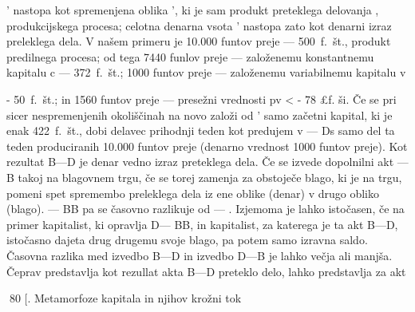 \documentclass[kapital_02.tex]{subfiles}
\begin{document}
\KPED' nastopa kot spremenjena oblika \KPEB', ki je sam produkt preteklega delovanja \KPEP, produkcijskega procesa; celotna denarna vsota \KPED' nastopa zato kot denarni izraz preleklega dela. V našem primeru je 10.000 funtov preje — 500~f.~št., produkt predilnega procesa; od tega 7440 funlov preje — založenemu konstantnemu kapitalu c — 372~f.~št.; 1000 funtov preje — založenemu variabilnemu kapitalu v

- 50~f.~št.; in 1560 funtov preje — presežni vrednosti pv < - 78 £f. ši. Če se pri sicer nespremenjenih okoliščinah na novo založi od \KPED' samo začetni kapital, ki je enak 422~f.~št., dobi delavec prihodnji teden kot predujem v \KPED — Ds samo del ta teden produciranih 10.000 funtov preje (denarno vrednost 1000 funtov preje). Kot rezultat B—D je denar vedno izraz preteklega dela. Če se izvede dopolnilni akt \KPED —B takoj na blagovnem trgu, če se torej zamenja \KPED za obstoječe blago, ki je na trgu, pomeni spet spremembo preleklega dela iz ene oblike (denar) v drugo obliko (blago). \KPED — BB pa se časovno razlikuje od \KPEB — \KPED. Izjemoma je lahko istočasen, če na primer kapitalist, ki opravlja D— BB, in kapitalist, za katerega je ta akt B—D, istočasno dajeta drug drugemu svoje blago, \KPED pa potem samo izravna saldo. Časovna razlika med izvedbo B—D in izvedbo D—B je lahko večja ali manjša. Čeprav predstavlja \KPED kot rezullat akta B—D preteklo delo, lahko predstavlja \KPED za akt



80 [. Metamorfoze kapitala in njihov krožni tok
\end{document}
